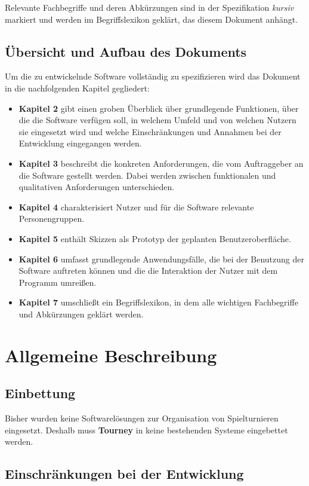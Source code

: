 \documentclass[11pt]{article}
\begin{document}
Relevante Fachbegriffe und deren Abkürzungen sind in der Spezifikation \textit{kursiv} markiert und werden im Begriffslexikon geklärt, das diesem Dokument anhängt.

\subsection{Übersicht und Aufbau des Dokuments}

Um die zu entwickelnde Software vollständig zu spezifizieren wird das Dokument in die nachfolgenden Kapitel gegliedert:
\begin{itemize}
	\item[] \textbf{Kapitel 2} gibt einen groben Überblick über grundlegende Funktionen, über die die Software verfügen soll, in welchem Umfeld und von welchen Nutzern sie eingesetzt wird und welche Einschränkungen und Annahmen bei der Entwicklung eingegangen werden.
	\item[] \textbf{Kapitel 3} beschreibt die konkreten Anforderungen, die vom Auftraggeber an die Software gestellt werden. Dabei werden zwischen funktionalen und qualitativen Anforderungen unterschieden.
	\item[] \textbf{Kapitel 4} charakterisiert Nutzer und für die Software relevante Personengruppen.
	\item[] \textbf{Kapitel 5} enthält Skizzen als Prototyp der geplanten Benutzeroberfläche.
	\item[] \textbf{Kapitel 6} umfasst grundlegende Anwendungsfälle, die bei der Benutzung der Software auftreten können und die die Interaktion der Nutzer mit dem Programm umreißen.
	\item[] \textbf{Kapitel 7} umschließt ein Begriffslexikon, in dem alle wichtigen Fachbegriffe und Abkürzungen geklärt werden.
\end{itemize}

\section{Allgemeine Beschreibung}

\subsection{Einbettung}

Bisher wurden keine Softwarelösungen zur Organisation von Spielturnieren eingesetzt. Deshalb muss \textbf{Tourney} in keine bestehenden Systeme eingebettet werden.

\subsection{Einschränkungen bei der Entwicklung}
\end{document}
